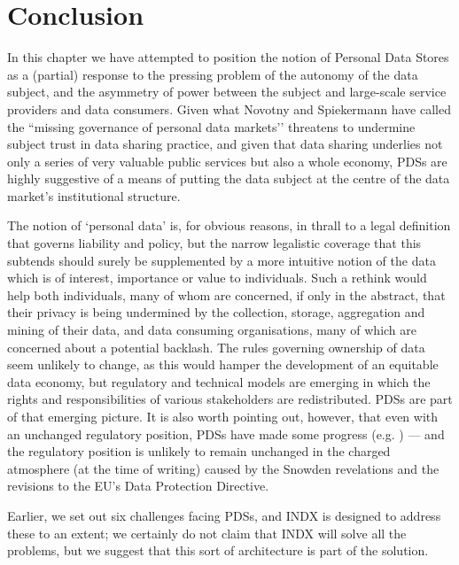 \documentclass[graybox]{svmult}
\begin{document}
\section{Conclusion}

In this chapter we have attempted to position the notion of Personal Data Stores as a (partial) response to the pressing problem of the autonomy of the data subject, and the asymmetry of power between the subject and large-scale service providers and data consumers. Given what Novotny and Spiekermann have called the ``missing governance of personal data markets’’ \cite{novotny2013} threatens to undermine subject trust in data sharing practice, and given that data sharing underlies not only a series of very valuable public services but also a whole economy, PDSs are highly suggestive of a means of putting the data subject at the centre of the data market’s institutional structure.

The notion of `personal data’ is, for obvious reasons, in thrall to a legal definition that governs liability and policy, but the narrow legalistic coverage that this subtends should surely be supplemented by a more intuitive notion of the data which is of interest, importance or value to individuals. Such a rethink would help both individuals, many of whom are concerned, if only in the abstract, that their privacy is being undermined by the collection, storage, aggregation and mining of their data, and data consuming organisations, many of which are concerned about a potential backlash. The rules governing ownership of data seem unlikely to change, as this would hamper the development of an equitable data economy, but regulatory and technical models are emerging in which the rights and responsibilities of various stakeholders are redistributed. PDSs are part of that emerging picture. It is also worth pointing out, however, that even with an unchanged regulatory position, PDSs have made some progress (e.g. \cite{heath2013}) --- and the regulatory position is unlikely to remain unchanged in the charged atmosphere (at the time of writing) caused by the Snowden revelations and the revisions to the EU’s Data Protection Directive.

Earlier, we set out six challenges facing PDSs, and INDX is designed to address these to an extent; we certainly do not claim that INDX will solve all the problems, but we suggest that this sort of architecture is part of the solution.





\end{document}
